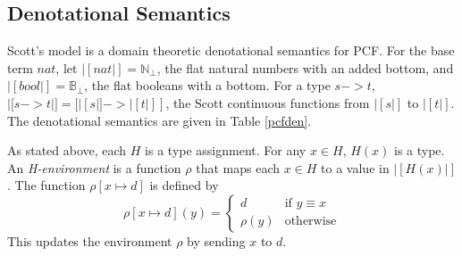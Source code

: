 \subsection{Denotational Semantics}

Scott's model is a domain theoretic denotational semantics for PCF.  For the base term $nat$, let $|[nat|] = \mathbb{N}_{\bot}$, the flat natural numbers with an added bottom, and $|[bool|] = \mathbb{B}_{\bot}$, the flat booleans with a bottom.  For a type $s->t$, $|[s->t|] = [|[s|] -> |[t|]]$, the Scott continuous functions from $|[s|]$ to $|[t|]$.  The denotational semantics are given in Table \ref{pcfden}.

As stated above, each $H$ is a type assignment.  For any $x\in H$, $H(x)$ is a type.  An \emph{H-environment} is a function $\rho$ that maps each $x\in H$ to a value in $|[H(x)|]$.  The function $\rho[x\mapsto d]$ is defined by
\[
\rho[x\mapsto d](y) = \begin{cases}
	d & \text{if } y\equiv x \\
	\rho(y) & \text{otherwise}
	\end{cases}
\]
This updates the environment $\rho$ by sending $x$ to $d$.

